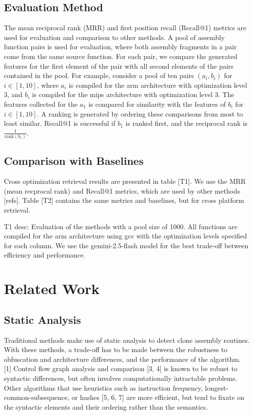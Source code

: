\documentclass[conference,compsoc]{IEEEtran}
\begin{document}
\subsection{Evaluation Method}

The mean reciprocal rank (MRR) and first position recall (Recall@1) metrics are used for evaluation and comparison to other methods.
A pool of assembly function pairs is used for evaluation, where both assembly fragments in a pair come from the same source function.
For each pair, we compare the generated features for the first element of the pair with all second elements of the pairs contained
in the pool.  For example, consider a pool of ten pairs \((a_i, b_i)\) for \(i \in [1, 10]\), where \(a_i\) is compiled for the arm
architecture with optimization level 3, and \(b_i\) is compiled for the mips architecture with optimization
level 3. The features collected for the \(a_1\) is compared for similarity with the features of \(b_i\) for \(i \in [1, 10]\).
A ranking is generated by ordering these comparisons from most to least similar. Recall@1 is successful
if \(b_1\) is ranked first, and the reciprocal rank is \(\frac{1}{\text{rank}(b_1)}\).

\subsection{Comparison with Baselines}

Cross optimization retrieval results are presented in table [T1]. We use the MRR (mean recprocal rank) and Recall@1 metrics, which are used
by other methods [refs]. Table [T2] contains the same metrics and baselines, but for cross platform retrieval.

T1 desc: Evaluation of the methods with a pool size of 1000. All functions are compiled for the arm architecture using gcc with the
optimization levels specified for each column. We use the gemini-2.5-flash model for the best trade-off between efficiency and performance.

\section{Related Work}

\subsection{Static Analysis}

Traditional methods make use of static analysis to detect clone assembly routines. With these methods, a trade-off has
to be made between the robustness to obfuscation and architecture differences, and the performance of the algorithm. [1]
Control flow graph analysis and comparison [3, 4] is known to be robust to syntactic differences, but often involves computationally intractable
problems. Other algorithms that use heuristics such as instruction frequency, longest-common-subsequence, or hashes [5, 6, 7] are more
efficient, but tend to fixate on the syntactic elements and their ordering rather than the semantics.
\end{document}
